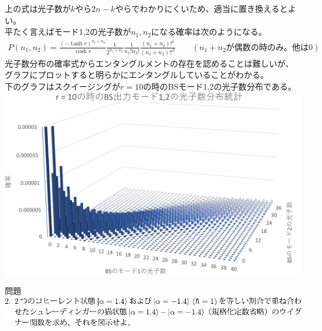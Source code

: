 \documentclass{jsarticle}
\begin{document}
上の式は光子数が$k$やら$2n-k$やらでわかりにくいため、適当に置き換えるとよい。\\
平たく言えばモード1,2の光子数が$n_1,n_2$になる確率は次のようになる。
\begin{gather*}
	P(n_1,n_2) = \frac{(-\tanh r)^{n_1 + n_2}}{\cosh r} \frac{1}{2^{n_1 + n_2}} \frac{1}{n_1 ! n_2 !} \frac{(n_1+n_2)!^2}{(n_1+n_2)!!^2} 
	\qquad (n_1+n_2\text{が偶数の時のみ。他は0})
\end{gather*}
光子数分布の確率式からエンタングルメントの存在を認めることは難しいが、\\
グラフにプロットすると明らかにエンタングルしていることがわかる。\\
下のグラフはスクイージングが$r=10$の時のBSモード1,2の光子数分布である。\\


\includegraphics[width=0.9\linewidth]{./graphics/photon_sq.pdf}


\begin{itembox}[l]{問題}
	\vspace*{-0mm}
	\centering
	\includegraphics[width=1\linewidth]{./graphics/2.pdf}
\end{itembox}
\end{document}
